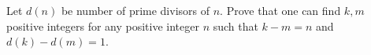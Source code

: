 Let $d(n)$ be number of prime divisors of $n$. Prove that one can find $k,m$ positive integers for any positive integer $n$ such that $k-m=n$ and $d(k)-d(m)=1$.
